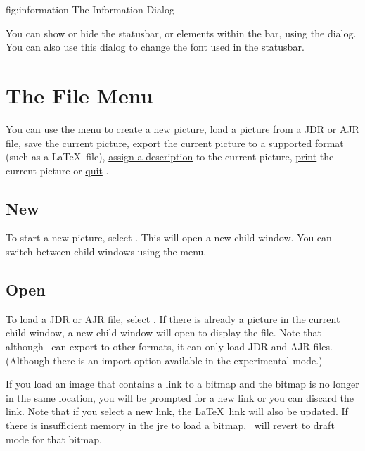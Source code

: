 \FloatFig
  {fig:information}
  {}
  {The Information Dialog}

You can show or hide the \gls*{statusbar}, or elements within the
bar, using the  dialog. You can also use this
dialog to change the font used in the \gls*{statusbar}.


\chapter{The File Menu}\label{sec:filemenu}


You can use the  menu to create a
\hyperref[sec:newimage]{new} picture,
\hyperref[sec:loadimage]{load} a picture from a
\gls{JDR} or \gls{AJR} file,
\hyperref[sec:saveimage]{save} the current picture,
\hyperref[sec:exportimage]{export} the current
picture to a supported format (such as a \LaTeX\ file),
\hyperref[sec:imagedescription]{assign a description} to the
current picture, \hyperref[sec:print]{print} the
current picture or \hyperref[sec:quit]{quit} \FlowframTk.

\section{New}\label{sec:newimage}


To start a new picture, select . This will open
a new child window. You can switch between child windows using the
 menu.

\section{Open}\label{sec:loadimage}


To load a \gls{JDR} or \gls{AJR} file, select .
If there is already a picture in the current child window, a new
child window will open to display the file. Note that although
\FlowframTk\ can export to other formats, it can only load
\gls{JDR} and \gls{AJR} files. (Although there is an import option
available in the experimental mode.)

If you load an image that contains a link to a \gls{bitmap} and
the bitmap is no longer in the same location, you will be prompted
for a new link or you can discard the link. Note that if you
select a new link, the \LaTeX\ link will also be updated.
If there is insufficient memory in the \gls{jre} to load a bitmap,
\FlowframTk\ will revert to draft mode for that bitmap.

